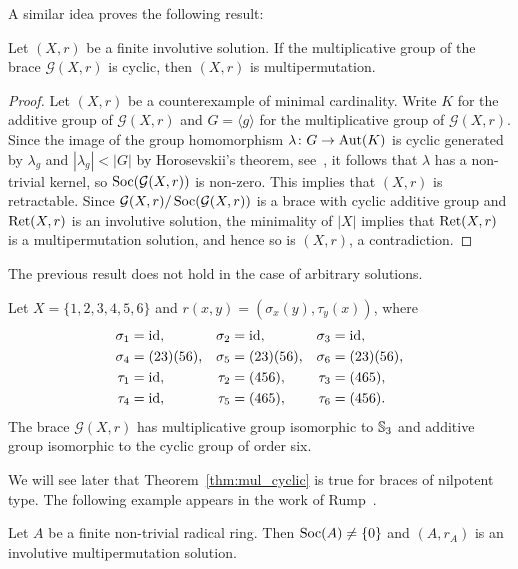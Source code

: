 A similar idea proves the following result:

\begin{theorem}
\label{thm:mul_cyclic}
Let $(X,r)$ be a finite involutive solution. If the multiplicative group 
of the brace $\mathcal{G}(X,r)$ is cyclic, then $(X,r)$ 
is multipermutation.
\end{theorem}

\begin{proof}
    Let $(X,r)$ be a counterexample of minimal cardinality. Write $K$ for the additive 
    group of $\mathcal{G}(X,r)$ and 
    $G=\langle g\rangle$ for the multiplicative group of $\mathcal{G}(X,r)$. Since 
    the image of the group homomorphism $\lambda\colon G\to\operatorname{Aut}(K)$ is cyclic generated by $\lambda_g$ and 
    $|\lambda_g|<|G|$ by Horosevskii's theorem, see~\cite[Corollary 3.3]{MR2426855}, it follows that 
    $\lambda$ has a non-trivial kernel, so $\operatorname{Soc}(\mathcal{G}(X,r))$ is non-zero.  
    This implies that $(X,r)$ is retractable. 
    Since $\mathcal{G}(X,r)/\operatorname{Soc}(\mathcal{G}(X,r))$ is a brace with cyclic 
    additive group and $\operatorname{Ret}(X,r)$ is an involutive solution, the 
    minimality of $|X|$ implies that 
    $\operatorname{Ret}(X,r)$ is a multipermutation solution, and hence so is $(X,r)$, 
    a contradiction. 
\end{proof}

The previous result does not hold in the case of arbitrary solutions.

\begin{example}
Let $X=\{1,2,3,4,5,6\}$ and $r(x,y)=(\sigma_x(y),\tau_y(x))$, where
\begin{align*}
    \sigma_1 &= \operatorname{id}, & \sigma_2&=\operatorname{id}, & \sigma_3 &= \operatorname{id},\\
    \sigma_4&=(23)(56), &\sigma_5 &= (23)(56), & \sigma_6&=(23)(56),\\
    \tau_1 &= \operatorname{id}, & \tau_2&=(456), & \tau_3 &= (465),\\
    \tau_4&=\operatorname{id}, &\tau_5 &= (465), & \tau_6&=(456).
\end{align*}
The brace $\mathcal{G}(X,r)$ has multiplicative group isomorphic to $\mathbb{S}_3$ and
additive group isomorphic to the cyclic group of order six. 
\end{example}

We will see later that Theorem~\ref{thm:mul_cyclic}
is true for braces of nilpotent type. 
The following example appears in the work of Rump~\cite{MR2278047}.

\begin{proposition}
\label{pro:radical}
Let $A$ be a finite non-trivial radical ring. Then $\operatorname{Soc}(A)\ne\{0\}$ and 
$(A,r_A)$ is an involutive multipermutation solution. 
\end{proposition}

